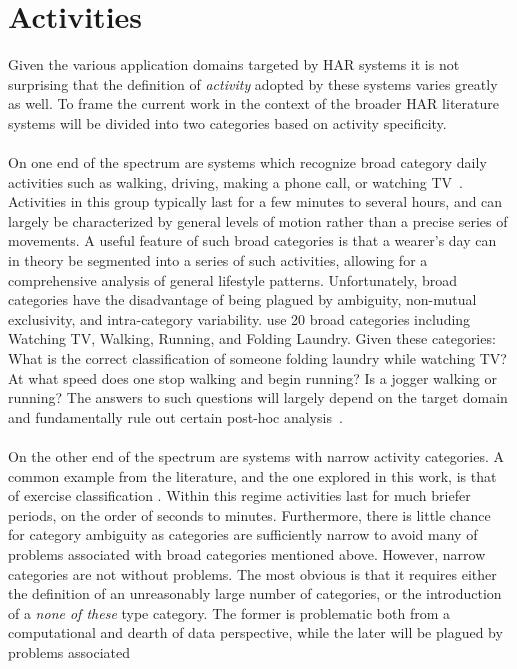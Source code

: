 \documentclass[12pt]{report}
\newcommand{\1}[0]{\mathbbm{1}}
\begin{document}
\section{Activities}
\label{sec:HAR-Activities}
Given the various application domains targeted by \ac{HAR} systems it is not surprising
that the definition of \emph{activity} adopted by these systems varies greatly as well.
To frame the current work in the context of the broader \ac{HAR} literature systems will
be divided into two categories based on activity specificity.
\\\\
On one end of the spectrum are systems which recognize broad category daily activities
such as walking, driving, making a phone call, or watching TV~\cite{multiple-sensor-bao}.
Activities in this group typically last for a few minutes to several hours,
and can largely be characterized by general levels of motion rather than a precise
series of movements. A useful feature of such broad categories is that a wearer's day
can in theory be segmented into a series of such activities, allowing for a comprehensive
analysis of general lifestyle patterns. Unfortunately, broad categories have the disadvantage
of being plagued by ambiguity, non-mutual exclusivity, and intra-category variability.
\cite{multiple-sensor-bao} use 20 broad categories including Watching TV, Walking,
Running, and Folding Laundry. Given these categories: What is the correct classification of
someone folding laundry while watching TV? At what speed does one stop walking and begin running?
Is a jogger walking or running? The answers to such questions will largely depend on the target
domain and fundamentally rule out certain post-hoc analysis~\cite{ms-overview}.
\\\\
On the other end of the spectrum are systems with narrow activity categories.
A common example from the literature, and the one explored in this work,
is that of exercise classification \cite{ms-activity}. Within this regime activities
last for much briefer periods, on the order of seconds to minutes. Furthermore,
there is little chance for category ambiguity as categories are sufficiently narrow
to avoid many of problems associated with broad categories mentioned above. However,
narrow categories are not without problems. The most obvious is that it requires either
the definition of an unreasonably large number of categories, or the introduction of a
\emph{none of these} type category. The former is problematic both from a computational
and dearth of data perspective, while the later will be plagued by problems associated
\end{document}
